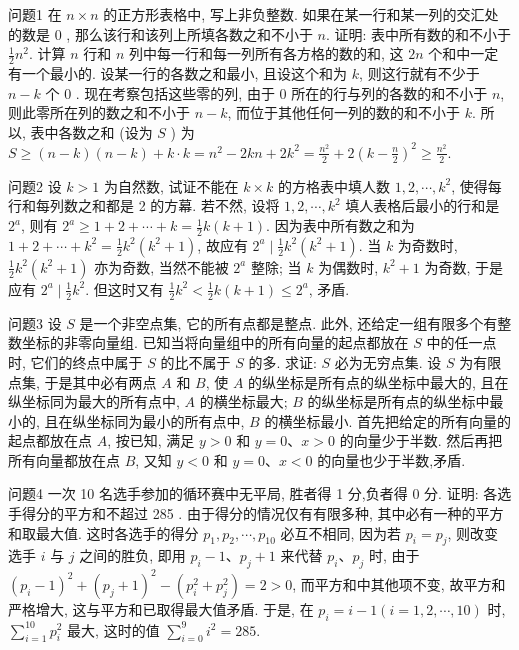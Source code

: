 
问题1 在 $n \times n$ 的正方形表格中, 写上非负整数.
如果在某一行和某一列的交汇处的数是 0 , 那么该行和该列上所填各数之和不小于 $n$. 证明: 表中所有数的和不小于 $\frac{1}{2} n^2$.
计算 $n$ 行和 $n$ 列中每一行和每一列所有各方格的数的和, 这 $2 n$ 个和中一定有一个最小的.
设某一行的各数之和最小, 且设这个和为 $k$, 则这行就有不少于 $n-k$ 个 0 . 现在考察包括这些零的列, 由于 0 所在的行与列的各数的和不小于 $n$, 则此零所在列的数之和不小于 $n-k$, 而位于其他任何一列的数的和不小于 $k$. 所以, 表中各数之和 (设为 $S$ ) 为 $S \geqslant(n-k)(n-k)+k \cdot k= n^2-2 k n+2 k^2=\frac{n^2}{2}+2\left(k-\frac{n}{2}\right)^2 \geqslant \frac{n^2}{2}$.



问题2 设 $k>1$ 为自然数, 试证不能在 $k \times k$ 的方格表中填人数 $1,2, \cdots, k^2$, 使得每行和每列数之和都是 2 的方幕.
若不然, 设将 $1,2, \cdots, k^2$ 填人表格后最小的行和是 $2^a$, 则有 $2^a \geqslant 1+2+\cdots+k=\frac{1}{2} k(k+1)$. 因为表中所有数之和为 $1+2+\cdots+k^2= \frac{1}{2} k^2\left(k^2+1\right)$, 故应有 $2^a \mid \frac{1}{2} k^2\left(k^2+1\right)$. 当 $k$ 为奇数时, $\frac{1}{2} k^2\left(k^2+1\right)$ 亦为奇数, 当然不能被 $2^a$ 整除; 当 $k$ 为偶数时, $k^2+1$ 为奇数, 于是应有 $2^a \mid \frac{1}{2} k^2$. 但这时又有 $\frac{1}{2} k^2<\frac{1}{2} k(k+1) \leqslant 2^a$, 矛盾.



问题3 设 $S$ 是一个非空点集, 它的所有点都是整点.
此外, 还给定一组有限多个有整数坐标的非零向量组.
已知当将向量组中的所有向量的起点都放在 $S$ 中的任一点时, 它们的终点中属于 $S$ 的比不属于 $S$ 的多.
求证: $S$ 必为无穷点集.
设 $S$ 为有限点集, 于是其中必有两点 $A$ 和 $B$, 使 $A$ 的纵坐标是所有点的纵坐标中最大的, 且在纵坐标同为最大的所有点中, $A$ 的横坐标最大; $B$ 的纵坐标是所有点的纵坐标中最小的, 且在纵坐标同为最小的所有点中, $B$ 的横坐标最小.
首先把给定的所有向量的起点都放在点 $A$, 按已知, 满足 $y>0$ 和 $y=0 、 x>0$ 的向量少于半数.
然后再把所有向量都放在点 $B$, 又知 $y<0$ 和 $y=0 、 x<0$ 的向量也少于半数,矛盾.



问题4 一次 10 名选手参加的循环赛中无平局, 胜者得 1 分,负者得 0 分.
证明: 各选手得分的平方和不超过 285 .
由于得分的情况仅有有限多种, 其中必有一种的平方和取最大值.
这时各选手的得分 $p_1, p_2, \cdots, p_{10}$ 必互不相同, 因为若 $p_i=p_j$, 则改变选手 $i$ 与 $j$ 之间的胜负, 即用 $p_i-1 、 p_j+1$ 来代替 $p_i 、 p_j$ 时, 由于 $\left(p_i-1\right)^2+ \left(p_j+1\right)^2-\left(p_i^2+p_j^2\right)=2>0$, 而平方和中其他项不变, 故平方和严格增大, 这与平方和已取得最大值矛盾.
于是, 在 $p_i=i-1(i=1,2, \cdots, 10)$ 时, $\sum_{i=1}^{10} p_i^2$ 最大, 这时的值 $\sum_{i=0}^9 i^2=285$.



